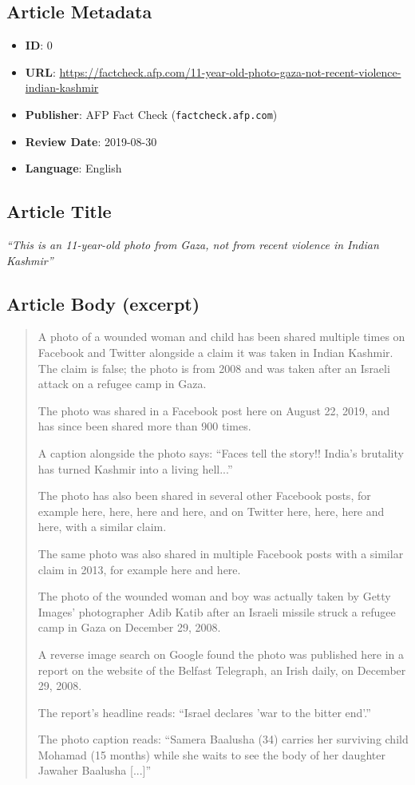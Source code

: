 \documentclass[10pt]{article}
\begin{document}
\subsection{Article Metadata}

\begin{itemize}[itemsep=3pt]
    \item \textbf{ID}: 0
    \item \textbf{URL}: \url{https://factcheck.afp.com/11-year-old-photo-gaza-not-recent-violence-indian-kashmir}
    \item \textbf{Publisher}: AFP Fact Check (\texttt{factcheck.afp.com})
    \item \textbf{Review Date}: 2019-08-30
    \item \textbf{Language}: English
\end{itemize}

\subsection{Article Title}

\textit{``This is an 11-year-old photo from Gaza, not from recent violence in Indian Kashmir''}

\subsection{Article Body (excerpt)}

\begin{quote}
\small
A photo of a wounded woman and child has been shared multiple times on Facebook and Twitter alongside a claim it was taken in Indian Kashmir. The claim is false; the photo is from 2008 and was taken after an Israeli attack on a refugee camp in Gaza.

The photo was shared in a Facebook post here on August 22, 2019, and has since been shared more than 900 times.

A caption alongside the photo says: ``Faces tell the story!! India's brutality has turned Kashmir into a living hell...''

The photo has also been shared in several other Facebook posts, for example here, here, here and here, and on Twitter here, here, here and here, with a similar claim.

The same photo was also shared in multiple Facebook posts with a similar claim in 2013, for example here and here.

The photo of the wounded woman and boy was actually taken by Getty Images' photographer Adib Katib after an Israeli missile struck a refugee camp in Gaza on December 29, 2008.

A reverse image search on Google found the photo was published here in a report on the website of the Belfast Telegraph, an Irish daily, on December 29, 2008.

The report's headline reads: ``Israel declares 'war to the bitter end'.''

The photo caption reads: ``Samera Baalusha (34) carries her surviving child Mohamad (15 months) while she waits to see the body of her daughter Jawaher Baalusha [...]''
\end{quote}
\end{document}
